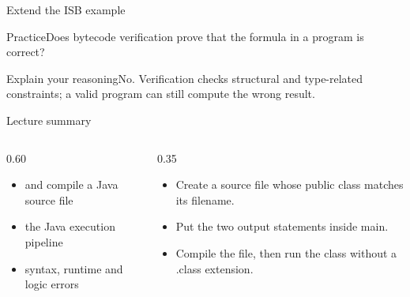 \documentclass[10pt,aspectratio=169]{beamer}
\begin{document}
\begin{frame}[fragile,t]{Extend the ISB example}
\begin{alertblock}{Practice}Does bytecode verification prove that the formula in a program is correct?\end{alertblock}\vspace{3mm}\begin{exampleblock}{Explain your reasoning}No. Verification checks structural and type{-}related constraints; a valid program can still compute the wrong result.\end{exampleblock}
\end{frame}
\begin{frame}[fragile,t]{Lecture summary}
\begin{columns}[T,onlytextwidth]\begin{column}{0.60\textwidth}
\begin{itemize}
\item and compile a Java source file
\item the Java execution pipeline
\item syntax, runtime and logic errors
\end{itemize}
\end{column}\begin{column}{0.35\textwidth}\small
\begin{itemize}
\item Create a source file whose public class matches its filename.
\item Put the two output statements inside main.
\item Compile the file, then run the class without a .class extension.
\end{itemize}
\end{column}\end{columns}
\end{frame}
\end{document}
